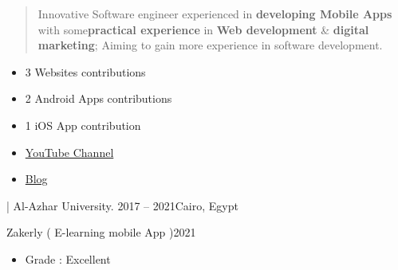 \documentclass[10pt,a4paper,ragged2e,withhyper]{altacv}
\begin{document}
\begin{paracol}{2}
        \switchcolumn

        \begin{quote}

            Innovative Software engineer experienced in \textbf{developing Mobile Apps} with some\textbf{practical experience}  in \textbf{Web development} \& \linebreak\textbf{digital marketing};
            Aiming to gain more experience in software development.

        \end{quote}

        \begin{itemize}
            \item 3 Websites contributions
            \item 2 Android Apps contributions
            \item 1 iOS App contribution

        \end{itemize}
        \divider

        \begin{itemize}
            \item  \href{https://www.youtube.com/c/LightFeather42}{YouTube Channel}
            \item  \href{https://lightfeather42.blogspot.com/}{Blog}

        \end{itemize}
        \divider
        \divider


        {| Al-Azhar University.}
        {2017 -- 2021}{Cairo, Egypt}
        \divider

        {Zakerly ( E-learning mobile App )}{2021}{}
        \begin{itemize}
            \item Grade : Excellent
        \end{itemize}
        \divider


\end{paracol}
\end{document}

